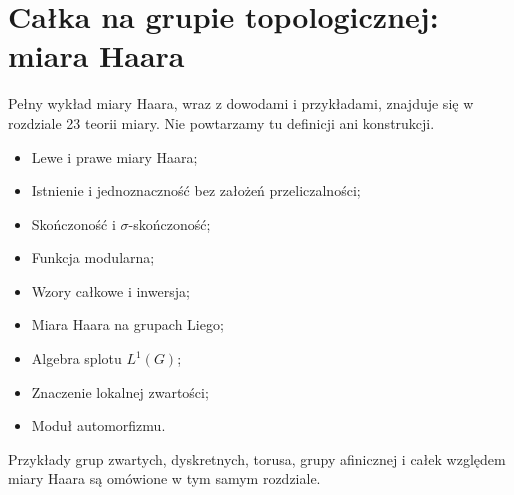 \providecommand{\atlasref}[2]{#2}
\section{Całka na grupie topologicznej: miara Haara}

Pełny wykład miary Haara, wraz z dowodami i przykładami,
znajduje się w \atlasref{ME-23::ch:haar-23}{rozdziale 23 teorii miary}.
Nie powtarzamy tu definicji ani konstrukcji.

\begin{itemize}
 \item \atlasref{ME-23::def:haar-23}{Lewe i prawe miary Haara};
 \item \atlasref{ME-23::thm:haar-main-23}{Istnienie i jednoznaczność bez założeń przeliczalności};
 \item \atlasref{ME-23::cor:haar-finiteness-23}{Skończoność i $\sigma$-skończoność};
 \item \atlasref{ME-23::thm:haar-modular-23}{Funkcja modularna};
 \item \atlasref{ME-23::cor:haar-integral-inversion-23}{Wzory całkowe i inwersja};
 \item \atlasref{ME-23::it:lem:haar-lie-volume}{Miara Haara na grupach Liego};
 \item \atlasref{ME-23::it:thm:haar-l1-convolution}{Algebra splotu $L^1(G)$};
 \item \atlasref{ME-23::it:ex:haar-ell2}{Znaczenie lokalnej zwartości};
 \item \atlasref{ME-23::tw:haar-automorfizm}{Moduł automorfizmu}.
\end{itemize}
Przykłady grup zwartych, dyskretnych, torusa,
grupy afinicznej i całek względem miary Haara
są omówione w tym samym rozdziale.

